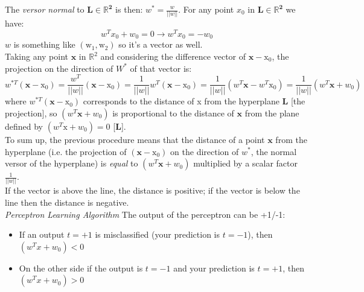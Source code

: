 The \textit{versor normal} to $\boldsymbol{L \in \mathbb{R}^2}$ is then: $ w^* = \frac{w}{||w||}$. For any point $x_0$ in $\boldsymbol{L \in \mathbb{R}^2}$ we have:
$$
w^{T} x_{0}+w_{0}=0 \rightarrow
w^T x_0 = -w_0
$$
$w$ is something like $(\mathrm{w}_{1},\mathrm{w}_{2})$ so it's a vector as well. \\
Taking any point $\boldsymbol{x}$ in $\mathbb{R}^2$ and considering the difference vector of $\boldsymbol{x} - \mathrm{x}_{0}$, the projection on the direction of $W^*$ of that vector is: 
$$
w^{*T} (\boldsymbol{x} - \mathrm{x}_{0}) = \frac{w^T}{||w||} (\boldsymbol{x} - \mathrm{x}_{0}) = \frac{1}{||w||} w^T(\boldsymbol{x} - \mathrm{x}_{0}) = \frac{1}{||w||} (w^T\boldsymbol{x} - w^{T}\mathrm{x}_{0}) = \frac{1}{||w||} (w^T\boldsymbol{x} + w_0)
$$
where $w^{*T} (\boldsymbol{x} - \mathrm{x}_{0})$ corresponds to the distance of x from the hyperplane $\boldsymbol{L}$ [the projection], so $(w^T\boldsymbol{x} + w_0)$ is proportional to the distance of $\boldsymbol{x}$ from the plane defined by $(w^T\mathrm{x} + w_0)=0$ [$\boldsymbol{L}$].\\
To sum up, the previous procedure means that the distance of a point $\boldsymbol{x}$ from the hyperplane (i.e. the projection of $(\boldsymbol{x} - \mathrm{x}_{0})$ on the direction of $w^*$, the normal versor of the hyperplane) is \textit{equal} to $(w^T\boldsymbol{x} + w_0)$ multiplied by a scalar factor $\frac{1}{||w||}$.\\
If the vector is above the line, the distance is positive; if the vector is below the line then the distance is negative. \\

\textit{Perceptron Learning Algorithm} The output of the perceptron can be +1/-1:
\begin{itemize}
    \item If an output $t=+1$ is misclassified (your prediction is $t=-1$), then $\left(w^{T} x+w_{0}\right) < 0$
    \item On the other side if the output is $t=-1$ and your prediction is $t=+1$, then $\left(w^{T} x+w_{0}\right) > 0$
\end{itemize}{}

